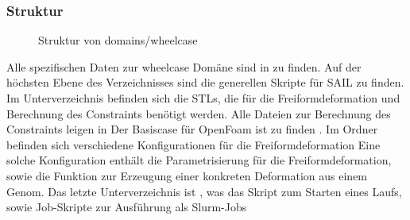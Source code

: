 \subsubsection{Struktur}

\begin{figure}[h]
\caption{Struktur von domains/wheelcase}
\label{fig:dir_wheelcase}
\end{figure}

Alle spezifischen Daten zur wheelcase Domäne sind in  zu finden.
Auf der höchsten Ebene des Verzeichnisses sind die generellen Skripte für SAIL zu finden.
Im Unterverzeichnis  befinden sich die STLs, die für die Freiformdeformation und Berechnung des Constraints benötigt werden.
Alle Dateien zur Berechnung des Constraints leigen in 
Der Basiscase für OpenFoam ist zu finden .
Im Ordner  befinden sich verschiedene Konfigurationen für die Freiformdeformation
Eine solche Konfiguration enthält die Parametrisierung für die Freiformdeformation, sowie die Funktion zur Erzeugung einer konkreten Deformation aus einem Genom.
Das letzte Unterverzeichnis ist , was das Skript zum Starten eines Laufs, sowie Job-Skripte zur Ausführung als Slurm-Jobs



